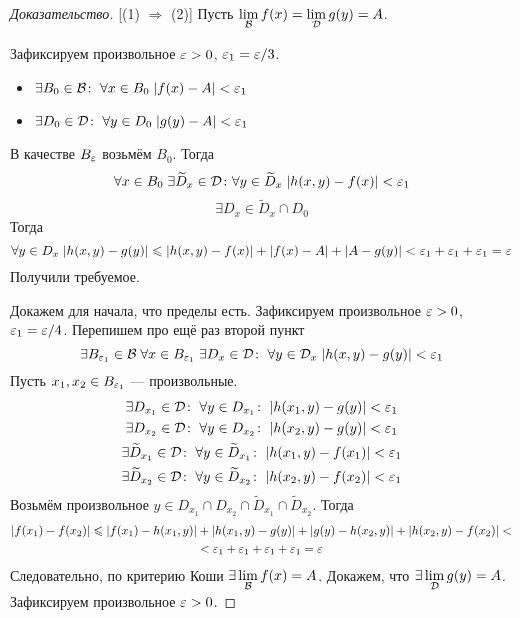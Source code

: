 \documentclass[a4paper, 12pt]{article}
\begin{document}
\begin{proof}[Доказательство]
    [(1) $\Rightarrow$ (2)] Пусть $\lim\limits_{\mathcal{B}} f(x) = \lim\limits_{\mathcal{D}} g(y) = A$. 
    \par Зафиксируем произвольное $\varepsilon > 0$, $\varepsilon_1 = \varepsilon/3$.
    \begin{itemize}
        \item $\exists B_0\in \mathcal{B}\colon\; \forall x\in B_0\; |f(x) - A| <\varepsilon_1$
        \item $\exists D_0\in \mathcal{D}\colon\; \forall y\in D_0\; |g(y) - A| <\varepsilon_1$
    \end{itemize}
    В качестве $B_\varepsilon$ возьмём $B_0$. Тогда
    $$
        \forall x\in B_0\; \exists \widetilde{D}_x \in \mathcal{D}\colon \forall y \in \widetilde{D}_x\; |h(x,y) -f(x)| < \varepsilon_1
    $$
    $$
        \exists D_x \in \widetilde{D}_x\cap D_0
    $$
    Тогда $$
    \forall y\in D_x\; |h(x,y) - g(y)| \leqslant |h(x,y) - f(x)| + |f(x) - A| + |A- g(y)| < \varepsilon_1 + \varepsilon_1 + \varepsilon_1 = \varepsilon
    $$
    Получили требуемое.
    \par [$(2) \Rightarrow (1)$] Докажем для начала, что пределы есть. Зафиксируем произвольное $\varepsilon > 0$, $\varepsilon_1 = \varepsilon/4$. Перепишем про ещё раз второй пункт
    $$
        \exists B_{\varepsilon_1} \in \mathcal{B}\; \forall x\in B_{\varepsilon_1}\; \exists D_x \in \mathcal{D}\colon\;  \forall y \in \mathcal{D}_x \; |h(x,y) - g(y)| < \varepsilon_1
    $$
    Пусть $x_1, x_2 \in B_{\varepsilon_1}$ --- произвольные.
    \begin{gather*}
        \exists D_{x_1} \in \mathcal{D}\colon \; \forall y\in D_{x_1}\colon \; |h(x_1,y) - g(y)|<\varepsilon_1\\
        \exists D_{x_2}\in \mathcal{D}\colon \; \forall y \in D_{x_2}\colon \; |h(x_2, y) - g(y)| < \varepsilon_1\\
        \exists \widetilde{D}_{x_1}\in \mathcal{D}\colon \; \forall y\in \widetilde{D}_{x_1}\colon \; |h(x_1,y) - f(x_1)| < \varepsilon_1\\
        \exists \widetilde{D}_{x_2} \in \mathcal{D}\colon \; \forall y\in \widetilde{D}_{x_2}\colon \; |h(x_2,y) - f(x_2)| < \varepsilon_1\\
    \end{gather*}
    Возьмём произвольное $y\in D_{x_1} \cap D_{x_2} \cap \widetilde{D}_{x_1}\cap \widetilde{D}_{x_2}$. Тогда
    \begin{gather}
        |f(x_1) - f(x_2)| \leqslant |f(x_1) - h(x_1, y)| + |h(x_1, y) - g(y)| + |g(y) - h(x_2, y)| + |h(x_2, y) - f(x_2)|<\\ < \varepsilon_1 + \varepsilon_1 + \varepsilon_1 + \varepsilon_1 = \varepsilon
    \end{gather}
    Следовательно, по критерию Коши $\exists \lim\limits_{\mathcal{B}} f(x) = A$. Докажем, что $\exists \lim \limits_{\mathcal{D}} g(y) = A$. Зафиксируем произвольное $\varepsilon > 0$.

\end{proof}
\end{document}
